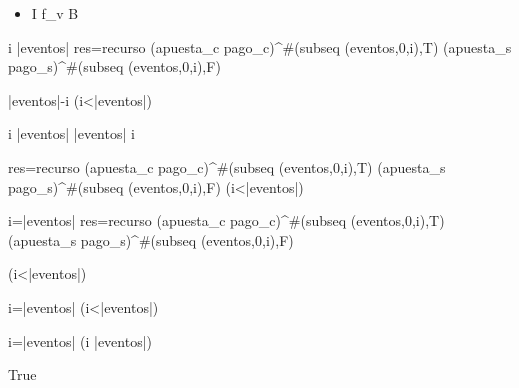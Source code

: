 \begin{itemize}
    \item I \wedge f_v  \rightarrow \neg B
\end{itemize}

 \leq i \leq |eventos| \wedge res=recurso (apuesta_c pago_c)^{\#(subseq (eventos,0,i),T)} (apuesta_s pago_s)^{\#(subseq (eventos,0,i),F)} \wedge 

|eventos|-i \longrightarrow \neg (i<|eventos|)
\vspace{0.3cm}

 \leq i \leq |eventos| \wedge |eventos| \leq i \wedge 

res=recurso (apuesta_c pago_c)^{\#(subseq (eventos,0,i),T)} (apuesta_s pago_s)^{\#(subseq (eventos,0,i),F)} \longrightarrow \neg (i<|eventos|)
\vspace{0.3cm}

\equiv i=|eventos| \wedge res=recurso (apuesta_c pago_c)^{\#(subseq (eventos,0,i),T)} (apuesta_s pago_s)^{\#(subseq (eventos,0,i),F)} \longrightarrow 

\neg (i<|eventos|)
\vspace{0.3cm}

\equiv i=|eventos| \longrightarrow \neg (i<|eventos|)
\vspace{0.3cm}

\equiv i=|eventos| \longrightarrow  (i \geq |eventos|)
\vspace{0.3cm}

\equiv True

